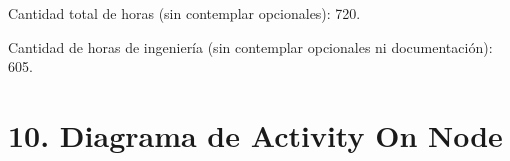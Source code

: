 \documentclass[
11pt, %
]{charter}
\begin{document}
Cantidad total de horas (sin contemplar opcionales): 720.

Cantidad de horas de ingeniería (sin contemplar opcionales ni documentación): 605.







\section{10. Diagrama de Activity On Node}
\label{sec:AoN}
\end{document}
